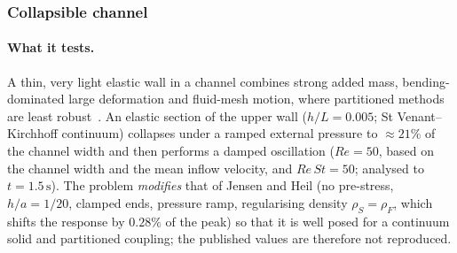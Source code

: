 \subsubsection{Collapsible channel}\label{sec:collapsible}

\paragraph{What it tests.}
A thin, very light elastic wall in a channel combines strong added mass, bending-dominated large deformation and fluid-mesh motion, where partitioned methods are least robust~\citep{Jensen2003, Heil2004, Heil2008}.
An elastic section of the upper wall ($h/L = 0.005$; St Venant--Kirchhoff continuum) collapses under a ramped external pressure to $\approx21\%$ of the channel width and then performs a damped oscillation ($Re = 50$, based on the channel width and the mean inflow velocity, and $Re\,St = 50$; analysed to $t = 1.5\,\mathrm{s}$).
The problem \emph{modifies} that of Jensen and Heil (no pre-stress, $h/a = 1/20$, clamped ends, pressure ramp, regularising density $\rho_S = \rho_F$, which shifts the response by $0.28\%$ of the peak) so that it is well posed for a continuum solid and partitioned coupling; the published values are therefore not reproduced.

